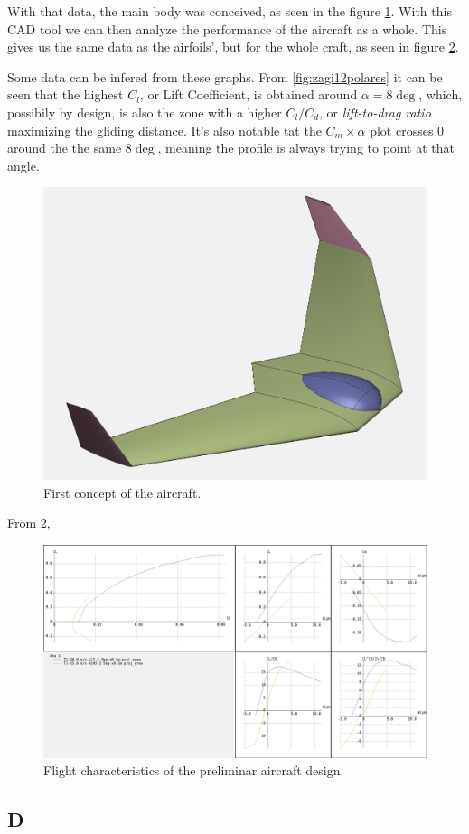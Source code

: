With that data, the main body was conceived, as seen in the figure \ref{fig:preliminar}. With this CAD tool we can then analyze the performance of the aircraft as a whole. This gives us the same data as the airfoils', but for the whole craft, as seen in figure \ref{fig:craftpolar}.

Some data can be infered from these graphs. From \ref{fig:zagi12polares} it can be seen that the highest $C_l$, or Lift Coefficient, is obtained around $\alpha = 8\deg$, which, possibily by design, is also the zone with a higher $C_l/C_d$, or \textit{lift-to-drag ratio} maximizing the gliding distance. It's also notable tat the $C_m  \times \alpha$ plot crosses 0 around the the same $8\deg$, meaning the profile is always trying to point at that angle.

\begin{figure}
\centering
  \includegraphics[width=\linewidth]{figs/preliminar.png}
  \caption{First concept of the aircraft.}
  \label{fig:preliminar}
\end{figure}


From \ref{fig:craftpolar}, 	

\begin{figure}
\centering
  \includegraphics[width=\linewidth]{figs/craftpolar.png}
  \caption{Flight characteristics of the preliminar aircraft design.}
  \label{fig:craftpolar}
\end{figure}


\subsection{D}



